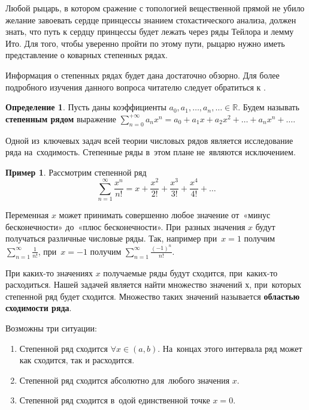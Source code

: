 \documentclass[pdftex, 12pt, a4paper]{article}
\def\R{\ensuremath{\mathbb{R}}} %
\theoremstyle{definition} %
\newtheorem*{mydef}{Определение}
\newtheorem{myex}{Пример}
\numberwithin{problem}{section}
\newcommand{\indef}[1]{\textbf{#1}}
\numberwithin{blits}{section}
\begin{document}
Любой рыцарь, в котором сражение с топологией вещественной прямой не убило желание завоевать сердце принцессы знанием стохастического анализа, должен знать, что путь к сердцу принцессы будет лежать через ряды Тейлора и лемму Ито. Для того, чтобы уверенно пройти по этому пути, рыцарю нужно иметь представление о коварных степенных рядах.

Информация о степенных рядах будет дана достаточно обзорно. Для более подробного изучения данного вопроса читателю следует обратиться к \cite{zorich:matan}.


\begin{mydef} Пусть даны коэффициенты $a_0, a_1, \hdots, a_n, \hdots \in \R$. Будем называть \indef{степенным рядом}  выражение $\displaystyle \sum_{n=0}^{+\infty} a_n x^n = a_0 + a_1 x + a_2 x^2 + \hdots + a_n x^n + \hdots$.
\end{mydef}


Одной из~ключевых задач всей теории числовых рядов является исследование ряда на~сходимость. Степенные ряды в~этом плане не~являются исключением.

\begin{myex}
Рассмотрим степенной ряд \[\sum_{n=1}^{\infty} \frac{x^n}{n!} = x + \frac{x^2}{2!}+\frac{x^3}{3!}+\frac{x^4}{4!}+ \hdots \]

Переменная $x$ может принимать совершенно любое значение от~«минус бесконечности» до~«плюс бесконечности». При~разных значения $x$ будут получаться различные числовые ряды. Так, например при~$x=1$ получим $\displaystyle \sum_{n=1}^{\infty} \frac{1}{n!}$, при~$x=-1$ получим $\displaystyle \sum_{n=1}^{\infty} \frac{(-1)^n}{n!}$.
\end{myex}

При каких-то значениях $x$ получаемые ряды будут сходится, при~каких-то расходиться. Нашей задачей является найти множество значений х, при~которых степенной ряд будет сходится. Множество таких значений называется \indef{областью сходимости ряда}. 

Возможны три ситуации:
\begin{enumerate}
\item Степенной ряд сходится $\forall x \in (a,b)$. На~концах этого интервала ряд может как сходится, так и расходится.
\item Степенной ряд сходится абсолютно для~любого значения $x$.
\item Степенной ряд сходится в~одой единственной точке $x=0$.
\end{enumerate}
\end{document}
